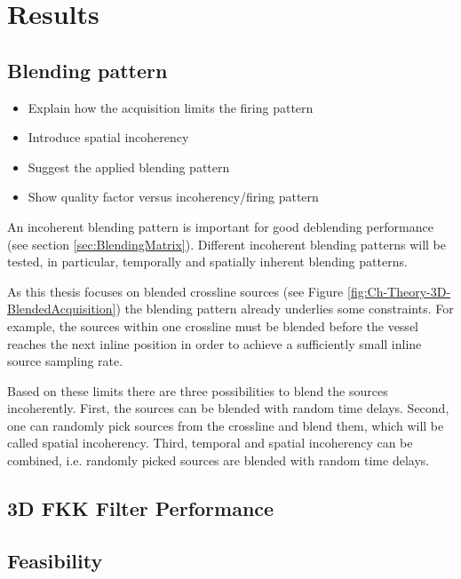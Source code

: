 \chapter{Results}

\section{Blending pattern}


\begin{itemize}
	\item Explain how the acquisition limits the firing pattern
	\item Introduce spatial incoherency
	\item Suggest the applied blending pattern
	\item Show quality factor versus incoherency/firing pattern
\end{itemize}

An incoherent blending pattern is important for good deblending performance (see section \ref{sec:BlendingMatrix}). Different incoherent blending patterns will be tested, in particular, temporally and spatially inherent blending patterns. 

As this thesis focuses on blended crossline sources (see Figure \ref{fig:Ch-Theory-3D-BlendedAcquisition}) the blending pattern already underlies some constraints. For example, the sources within one crossline must be blended before the vessel reaches the next inline position in order to achieve a sufficiently small inline source sampling rate. 

Based on these limits there are three possibilities to blend the sources incoherently. First, the sources can be blended with random time delays. Second, one can randomly pick sources from the crossline and blend them, which will be called spatial incoherency. Third, temporal and spatial incoherency can be combined, i.e. randomly picked sources are blended with random time delays.


\section{3D FKK Filter Performance}

\section{Feasibility}








